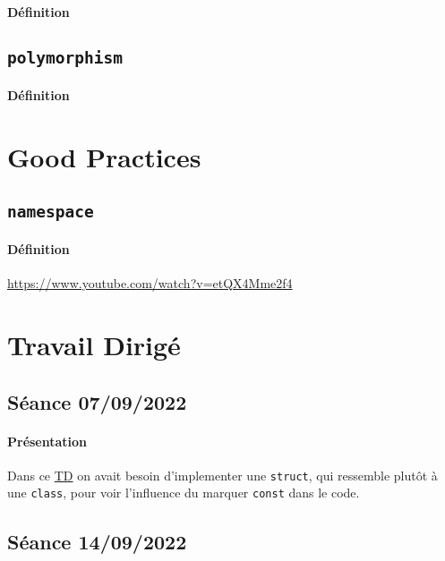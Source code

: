 \documentclass{article}
\begin{document}
\paragraph{Définition}

\subsection{\texttt{polymorphism}}
\paragraph{Définition}


\section{Good Practices}
\subsection{\texttt{namespace}}
\paragraph{Définition}\url{https://www.youtube.com/watch?v=etQX4Mme2f4}

\section{Travail Dirigé}
\subsection{Séance 07/09/2022}
\paragraph{Présentation}Dans ce \href{https://perso.ensta-paris.fr/~bmonsuez/Cours/doku.php?id=in204:seances:seance1}{TD} on avait besoin d'implementer une \texttt{struct}, qui ressemble plutôt à une \texttt{class}, pour voir l'influence du marquer \texttt{const} dans le code.
\begin{scriptsize}\mycode
    
\end{scriptsize}
\begin{scriptsize}\mycode
    
\end{scriptsize}

\newpage\subsection{Séance 14/09/2022}
\end{document}
